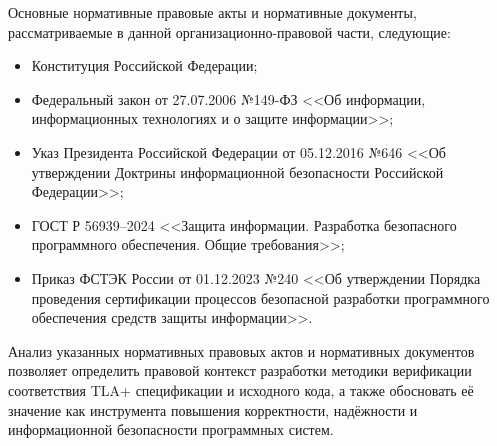 Основные нормативные правовые акты и нормативные документы,
рассматриваемые в данной организационно-правовой части, следующие:
\begin{itemize}
    \item Конституция Российской Федерации;
    \item Федеральный закон от 27.07.2006 №149-ФЗ <<Об информации, информационных технологиях и о защите информации>>;
    \item Указ Президента Российской Федерации от 05.12.2016 №646 <<Об утверждении Доктрины информационной безопасности Российской Федерации>>;
    \item ГОСТ Р 56939--2024 <<Защита информации. Разработка безопасного программного обеспечения. Общие требования>>;
    \item Приказ ФСТЭК России от 01.12.2023 №240 <<Об утверждении Порядка проведения сертификации процессов безопасной разработки программного обеспечения средств защиты информации>>.
\end{itemize}

Анализ указанных нормативных правовых актов и нормативных документов
позволяет определить правовой контекст разработки методики верификации
соответствия TLA+ спецификации и исходного кода, а также обосновать её
значение как инструмента повышения корректности, надёжности и
информационной безопасности программных систем.

